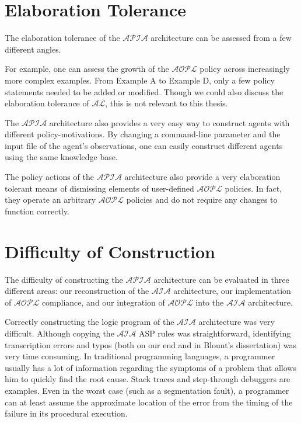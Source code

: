 \section{Elaboration Tolerance}

The elaboration tolerance of the $\mathcal{APIA}$ architecture can be assessed from a few different angles.

For example, one can assess the growth of the $\mathcal{AOPL}$ policy across increasingly more complex examples.
From Example A to Example D, only a few policy statements needed to be added or modified.
Though we could also discuss the elaboration tolerance of $\mathcal{AL}$, this is not relevant to this thesis.

The $\mathcal{APIA}$ architecture also provides a very easy way to construct agents with different policy-motivations.
By changing a command-line parameter and the input file of the agent's observations, one can easily construct different agents using the same knowledge base.

The policy actions of the $\mathcal{APIA}$ architecture also provide a very elaboration tolerant means of dismissing elements of user-defined $\mathcal{AOPL}$ policies.
In fact, they operate an arbitrary $\mathcal{AOPL}$ policies and do not require any changes to function correctly.

\section{Difficulty of Construction}

The difficulty of constructing the $\mathcal{APIA}$ architecture can be evaluated in three different areas: our reconstruction of the $\mathcal{AIA}$ architecture, our implementation of $\mathcal{AOPL}$ compliance, and our integration of $\mathcal{AOPL}$ into the $\mathcal{AIA}$ architecture.

Correctly constructing the logic program of the $\mathcal{AIA}$ architecture was very difficult.
Although copying the $\mathcal{AIA}$ ASP rules was straightforward, identifying transcription errors and typos (both on our end and in Blount's dissertation) was very time consuming.
In traditional programming languages, a programmer usually has a lot of information regarding the symptoms of a problem that allows him to quickly find the root cause.
Stack traces and step-through debuggers are examples.
Even in the worst case (such as a segmentation fault), a programmer can at least assume the approximate location of the error from the timing of the failure in its procedural execution.

